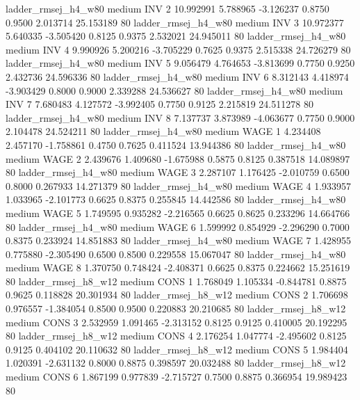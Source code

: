    ladder_rmsej_h4_w80     medium      INV                 2 10.992991 5.788965 -3.126237 0.8750 0.9500  2.013714   25.153189 80
   ladder_rmsej_h4_w80     medium      INV                 3 10.972377 5.640335 -3.505420 0.8125 0.9375  2.532021   24.945011 80
   ladder_rmsej_h4_w80     medium      INV                 4  9.990926 5.200216 -3.705229 0.7625 0.9375  2.515338   24.726279 80
   ladder_rmsej_h4_w80     medium      INV                 5  9.056479 4.764653 -3.813699 0.7750 0.9250  2.432736   24.596336 80
   ladder_rmsej_h4_w80     medium      INV                 6  8.312143 4.418974 -3.903429 0.8000 0.9000  2.339288   24.536627 80
   ladder_rmsej_h4_w80     medium      INV                 7  7.680483 4.127572 -3.992405 0.7750 0.9125  2.215819   24.511278 80
   ladder_rmsej_h4_w80     medium      INV                 8  7.137737 3.873989 -4.063677 0.7750 0.9000  2.104478   24.524211 80
   ladder_rmsej_h4_w80     medium     WAGE                 1  4.234408 2.457170 -1.758861 0.4750 0.7625  0.411524   13.944386 80
   ladder_rmsej_h4_w80     medium     WAGE                 2  2.439676 1.409680 -1.675988 0.5875 0.8125  0.387518   14.089897 80
   ladder_rmsej_h4_w80     medium     WAGE                 3  2.287107 1.176425 -2.010759 0.6500 0.8000  0.267933   14.271379 80
   ladder_rmsej_h4_w80     medium     WAGE                 4  1.933957 1.033965 -2.101773 0.6625 0.8375  0.255845   14.442586 80
   ladder_rmsej_h4_w80     medium     WAGE                 5  1.749595 0.935282 -2.216565 0.6625 0.8625  0.233296   14.664766 80
   ladder_rmsej_h4_w80     medium     WAGE                 6  1.599992 0.854929 -2.296290 0.7000 0.8375  0.233924   14.851883 80
   ladder_rmsej_h4_w80     medium     WAGE                 7  1.428955 0.775880 -2.305490 0.6500 0.8500  0.229558   15.067047 80
   ladder_rmsej_h4_w80     medium     WAGE                 8  1.370750 0.748424 -2.408371 0.6625 0.8375  0.224662   15.251619 80
   ladder_rmsej_h8_w12     medium     CONS                 1  1.768049 1.105334 -0.844781 0.8875 0.9625  0.118828   20.301934 80
   ladder_rmsej_h8_w12     medium     CONS                 2  1.706698 0.976557 -1.384054 0.8500 0.9500  0.220883   20.210685 80
   ladder_rmsej_h8_w12     medium     CONS                 3  2.532959 1.091465 -2.313152 0.8125 0.9125  0.410005   20.192295 80
   ladder_rmsej_h8_w12     medium     CONS                 4  2.176254 1.047774 -2.495602 0.8125 0.9125  0.404102   20.110632 80
   ladder_rmsej_h8_w12     medium     CONS                 5  1.984404 1.020391 -2.631132 0.8000 0.8875  0.398597   20.032488 80
   ladder_rmsej_h8_w12     medium     CONS                 6  1.867199 0.977839 -2.715727 0.7500 0.8875  0.366954   19.989423 80
